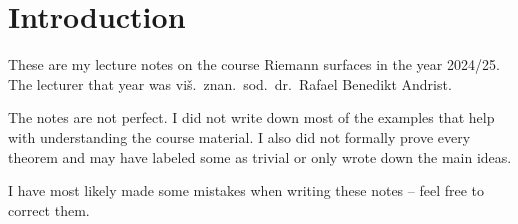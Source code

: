 \section*{Introduction}

These are my lecture notes on the course Riemann surfaces in the
year 2024/25. The lecturer that year was viš.~znan.~sod.~dr.~Rafael
Benedikt Andrist.

The notes are not perfect. I did not write down most of the examples
that help with understanding the course material. I also did not
formally prove every theorem and may have labeled some as trivial or
only wrote down the main ideas.

I have most likely made some mistakes when writing these notes --
feel free to correct them.
